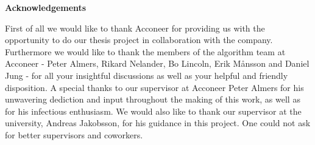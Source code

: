 \newenvironment{acknowledgements}%
    {\cleardoublepage\thispagestyle{empty}\null\vfill\begin{center}%
    \bfseries{\textsf{Acknowledgements}}\end{center}}
    {\vfill\null}
        \begin{acknowledgements}	
	First of all we would like to thank Acconeer for providing us with the opportunity to do our thesis project in collaboration with the company. Furthermore we would like to thank the members of the algorithm team at Acconeer - Peter Almers, Rikard Nelander, Bo Lincoln, Erik Månsson and Daniel Jung - for all your insightful discussions as well as your helpful and friendly disposition. A special thanks to our supervisor at Acconeer Peter Almers for his unwavering dediction and input throughout the making of this work, as well as for his infectious enthusiasm. We would also like to thank our supervisor at the university, Andreas Jakobsson, for his guidance in this project. One could not ask for better supervisors and coworkers.
        \end{acknowledgements}
